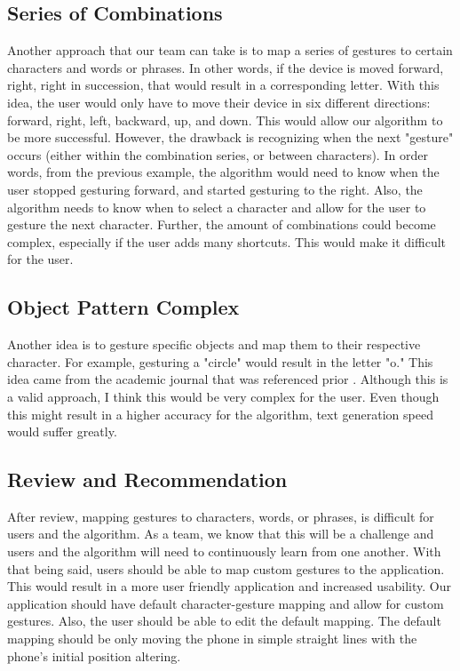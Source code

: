 \documentclass[onecolumn, draftclsnofoot,10pt, journal, letterpaper]{IEEEtran}
\begin{document}
    \subsection{Series of Combinations}
        Another approach that our team can take is to map a series of gestures to certain characters and words or phrases. In other words, if the device is moved forward, right, right in succession, that would result in a corresponding letter. With this idea, the user would only have to move their device in six different directions: forward, right, left, backward, up, and down. This would allow our algorithm to be more successful. However, the drawback is recognizing when the next "gesture" occurs (either within the combination series, or between characters). In order words, from the previous example, the algorithm would need to know when the user stopped gesturing forward, and started gesturing to the right. Also, the algorithm needs to know when to select a character and allow for the user to gesture the next character. Further, the amount of combinations could become complex, especially if the user adds many shortcuts. This would make it difficult for the user. 
    
    \subsection{Object Pattern Complex}
        Another idea is to gesture specific objects and map them to their respective character. For example, gesturing a "circle" would result in the letter "o." This idea came from the academic journal that was referenced prior \cite{teamarasovicMotionBasedGestureRecognition2015}. Although this is a valid approach, I think this would be very complex for the user. Even though this might result in a higher accuracy for the algorithm, text generation speed would suffer greatly.
    
    \subsection{Review and Recommendation}
        After review, mapping gestures to characters, words, or phrases, is difficult for users and the algorithm. As a team, we know that this will be a challenge and users and the algorithm will need to continuously learn from one another. With that being said, users should be able to map custom gestures to the application. This would result in a more user friendly application and increased usability. Our application should have default character-gesture mapping and allow for custom gestures. Also, the user should be able to edit the default mapping. The default mapping should be only moving the phone in simple straight lines with the phone's initial position altering.
\end{document}
